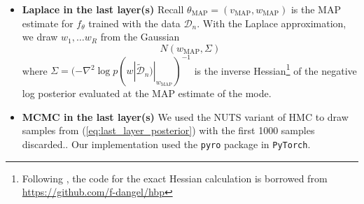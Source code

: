 \documentclass{article} %
\begin{document}
\begin{itemize}
	\item \textbf{Laplace in the last layer(s)}
	Recall $\theta_{\operatorname{MAP}} = (v_{\operatorname{MAP}}, w_{\operatorname{MAP}})$ is the MAP estimate for $f_\theta$ trained with the data $\mathcal D_n$. With the Laplace approximation, we draw $w_1,\ldots w_R$ from the Gaussian
	\[
	N(w_{\operatorname{MAP}}, \Sigma)
	\]
	where $\Sigma = (- \nabla^2 \log p(w| \tilde{\mathcal D}_n) |_{w_{\operatorname{MAP}}})^{-1}$ is the inverse Hessian\footnote{Following \citet{kristiadi_being_2020}, the code for the exact Hessian calculation is borrowed from \url{https://github.com/f-dangel/hbp}} of the negative log posterior evaluated at the MAP estimate of the mode.
	\item \textbf{MCMC in the last layer(s)}
	We used the NUTS variant of HMC to draw samples from (\ref{eq:last_layer_posterior}) with the first 1000 samples  discarded.. Our implementation used the \texttt{pyro} package in \texttt{PyTorch}.
	
\end{itemize}
\end{document}
